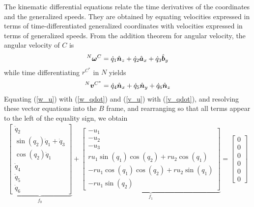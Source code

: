 The kinematic differential equations relate the time derivatives of the
coordinates and the generalized speeds. They are obtained by equating
velocities expressed in terms of time-differentiated generalized coordinates
with velocities expressed in terms of generalized speeds. From the addition
theorem for angular velocity, the angular velocity of $C$ is
\begin{equation}
  \label{w_qdot}
  {^N}\boldsymbol{\omega}^C = \dot{q}_1 \hat{\boldsymbol{n}}_{z} + \dot{q}_2 \hat{\boldsymbol{a}}_{x} + \dot{q}_3 \hat{\boldsymbol{b}}_{y}
\end{equation}
while time differentiating $r^{C^*}$ in $N$ yields
\begin{equation}
  \label{v_qdot}
  {^N}\boldsymbol{v}^{C^*} = \dot{q}_4 \hat{\boldsymbol{n}}_{x} + \dot{q}_5 \hat{\boldsymbol{n}}_{y} + \dot{q}_6 \hat{\boldsymbol{n}}_{z}
\end{equation}
Equating (\ref{w_u}) with (\ref{w_qdot}) and (\ref{v_u}) with (\ref{v_qdot}),
and resolving these vector equations into the $B$ frame, and rearranging so
that all terms appear to the left of the equality sign, we obtain
\begin{align}
    \label{rd:f_0_f_1}
\underbrace{\left[\begin{matrix}\dot{q}_{2}\\\sin\left(q_{2}\right)
    \dot{q}_{1} + \dot{q}_{3}\\\cos\left(q_{2}\right)
    \dot{q}_{1}\\\dot{q}_{4}\\\dot{q}_{5}\\\dot{q}_{6}\end{matrix}\right]}_{f_0}
    + 
\underbrace{\left[\begin{matrix}- u_{1}\\- u_{2}\\- u_{3}\\r u_{1}
    \sin\left(q_{1}\right) \cos\left(q_{2}\right) +
    r u_{2} \cos\left(q_{1}\right)\\- r u_{1}
    \cos\left(q_{1}\right) \cos\left(q_{2}\right) +
    r u_{2} \sin\left(q_{1}\right)\\- r u_{1}
    \sin\left(q_{2}\right)\end{matrix}\right]}_{f_1}
    = \left[\begin{matrix} 0\\ 0\\ 0\\ 0\\ 0\\ 0\end{matrix}\right]
\end{align}
